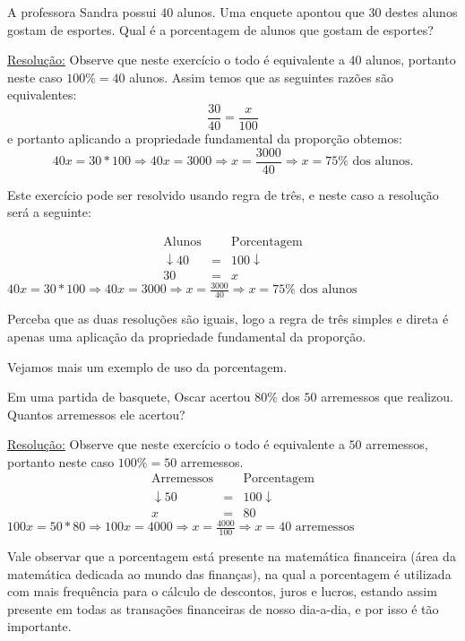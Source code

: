 \begin{exem}
 A professora Sandra possui $40$ alunos. Uma enquete apontou que $30$ destes alunos gostam de esportes. Qual é a porcentagem de alunos que gostam de esportes?

 \underline{Resolução:}
 Observe que neste exercício o todo é equivalente a $40$ alunos, portanto neste caso $100 \%= 40$ alunos. Assim temos que as seguintes razões são equivalentes:
  \[\frac{30}{40}= \frac{x}{100}\]
  e portanto aplicando a propriedade fundamental da proporção obtemos:
  \[40 x = 30*100 \Rightarrow 40 x = 3000 \Rightarrow x = \frac{3000}{40} \Rightarrow x=  75 \% \text{ dos alunos}.\]

 Este exercício pode ser resolvido usando regra de três, e neste caso a resolução será a seguinte:

  \begin{eqnarray*}
  \text{Alunos} & & \text{Porcentagem} \\
  \downarrow 40 & = & 100 \downarrow \\
  30 & = & x
 \end{eqnarray*}
 $40 x = 30*100 \Rightarrow 40 x = 3000 \Rightarrow x = \frac{3000}{40} \Rightarrow x=  75 \% \text{ dos alunos}$

 Perceba que as duas resoluções são iguais, logo a regra de três simples e direta é apenas uma aplicação da propriedade fundamental da proporção.
 \fim

\end{exem}

Vejamos mais um exemplo de uso da porcentagem.

\begin{exem}
 Em uma partida de basquete, Oscar acertou $80\%$ dos $50$ arremessos que realizou. Quantos arremessos ele acertou?

 \underline{Resolução:}
 Observe que neste exercício o todo é equivalente a $50$ arremessos, portanto neste caso $100 \%= 50$ arremessos.
  \begin{eqnarray*}
  \text{Arremessos} & & \text{Porcentagem} \\
  \downarrow 50 & = & 100 \downarrow \\
  x & = & 80
 \end{eqnarray*}
 $100 x = 50*80 \Rightarrow 100 x = 4000 \Rightarrow x = \frac{4000}{100} \Rightarrow x= 40 \text{ arremessos}$
 \fim

\end{exem}

Vale observar que a porcentagem está presente na matemática financeira (área da matemática dedicada ao mundo das finanças), na qual a porcentagem é utilizada com mais frequência para o cálculo de descontos, juros e lucros, estando assim presente em todas as transações financeiras de nosso dia-a-dia, e por isso é tão importante.


\newpage
